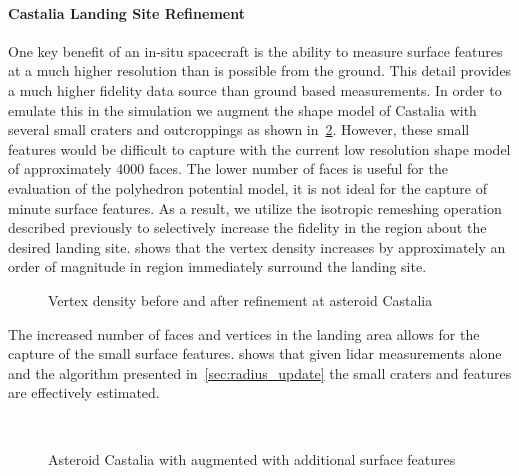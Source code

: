 \documentclass[letterpaper, paper,11pt]{AAS}		%
\begin{document}
\paragraph{Castalia Landing Site Refinement}
One key benefit of an in-situ spacecraft is the ability to measure surface features at a much higher resolution than is possible from the ground. 
This detail provides a much higher fidelity data source than ground based measurements. 
In order to emulate this in the simulation we augment the shape model of Castalia with several small craters and outcroppings as shown in~\cref{fig:castalia_refinement}.
However, these small features would be difficult to capture with the current low resolution shape model of approximately \num{4000} faces.
The lower number of faces is useful for the evaluation of the polyhedron potential model, it is not ideal for the capture of minute surface features. 
As a result, we utilize the isotropic remeshing operation described previously to selectively increase the fidelity in the region about the desired landing site.
 shows that the vertex density increases by approximately an order of magnitude in region immediately surround the landing site.
\begin{figure}[htbp]
    \centering

    \caption{Vertex density before and after refinement at asteroid Castalia\label{fig:castalia_refine_density}}
\end{figure}

The increased number of faces and vertices in the landing area allows for the capture of the small surface features.
 shows that given \gls{lidar} measurements alone and the algorithm presented in~\cref{sec:radius_update} the small craters and features are effectively estimated.
\begin{figure}[htbp]
    \centering
    ~
    \caption{Asteroid Castalia with augmented with additional surface features~\label{fig:castalia_refinement}}
\end{figure}
\end{document}
